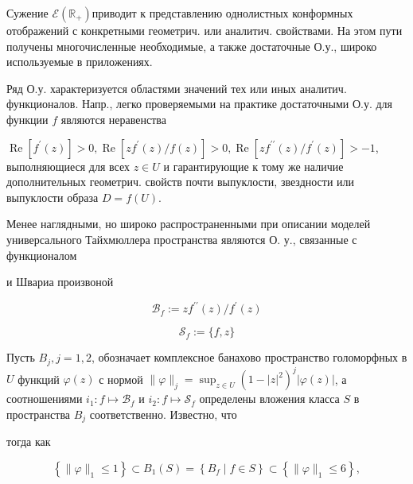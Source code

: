 \documentclass[10pt]{article}
\begin{document}
Сужение $\mathscr{E}\left(\mathbb{R}_{+}\right)$приводит к представлению однолистных конформных отображений с конкретными геометрич. или аналитич. свойствами. На этом пути получены многочисленные необходимые, а также достаточные О.у., широко используемые в приложениях.



Ряд О.у. характеризуется областями значений тех или иных аналитич. функционалов. Напр., легко проверяемыми на практике достаточными О.у. для функции $f$ являются неравенства



$\operatorname{Re}\left[f^{\prime}(z)\right]>0, \operatorname{Re}\left[z f^{\prime}(z) / f(z)\right]>0, \operatorname{Re}\left[z f^{\prime \prime}(z) / f^{\prime}(z)\right]>-1$, выполняющиеся для всех $z \in U$ и гарантирующие к тому же наличие дополнительных геометрич. свойств почти выпуклости, звездности или выпуклости образа $D=f(U)$.



Менее наглядными, но широко распространенными при описании моделей универсального Тайхмюллера пространства являются О. у., связанные с функционалом



и Швариа произвоной



\[

\mathscr{B}_{f}:=z f^{\prime \prime}(z) / f^{\prime}(z)

\]



\[

\mathscr{S}_{f}:=\{f, z\}

\]



Пусть $B_{j}, j=1,2$, обозначает комплексное банахово пространство голоморфных в $U$ функций $\varphi(z)$ с нормой $\|\varphi\|_{j}=\sup _{z \in U}\left(1-|z|^{2}\right)^{j}|\varphi(z)|$, а соотношениями $i_{1}: f \mapsto \mathscr{B}_{f}$ и $i_{2}: f \mapsto \mathscr{S}_{f}$ определены вложения класса $S$ в пространства $B_{j}$ соответственно. Известно, что



тогда как



\[

\left\{\|\varphi\|_{1} \leqslant 1\right\} \subset B_{1}(S)=\left\{B_{f} \mid f \in S\right\} \subset\left\{\|\varphi\|_{1} \leqslant 6\right\},

\]
\end{document}

